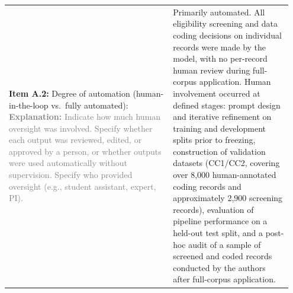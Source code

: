 \documentclass[12pt]{article}
\begin{document}
\begin{landscape}
{\begin{longtable}{|p{0.55\linewidth}|p{0.40\linewidth}|}
\hline
\textbf{Item A.2:} Degree of automation (human-in-the-loop vs.\ fully automated): \textcolor{gray}{{\footnotesize \textbf{Explanation:} Indicate how much human oversight was involved. Specify whether each output was reviewed, edited, or approved by a person, or whether outputs were used automatically without supervision. Specify who provided oversight (e.g., student assistant, expert, PI).}} & Primarily automated. All eligibility screening and data coding decisions on individual records were made by the model, with no per-record human review during full-corpus application. Human involvement occurred at defined stages: prompt design and iterative refinement on training and development splits prior to freezing, construction of validation datasets (CC1/CC2, covering over 8,000 human-annotated coding records and approximately 2,900 screening records), evaluation of pipeline performance on a held-out test split, and a post-hoc audit of a sample of screened and coded records conducted by the authors after full-corpus application.


\end{longtable}}
\end{landscape}
\end{document}
